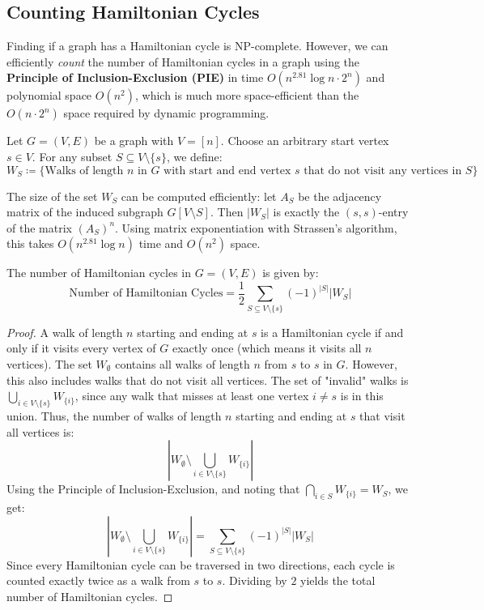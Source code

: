 \subsection{Counting Hamiltonian Cycles}

Finding if a graph has a Hamiltonian cycle is NP-complete. However, we can efficiently \textit{count} the number of Hamiltonian cycles in a graph using the \textbf{Principle of Inclusion-Exclusion (PIE)} in time $O(n^{2.81} \log n \cdot 2^n)$ and polynomial space $O(n^2)$, which is much more space-efficient than the $O(n \cdot 2^n)$ space required by dynamic programming.

\begin{definition}
    Let $G = (V, E)$ be a graph with $V = [n]$. Choose an arbitrary start vertex $s \in V$. For any subset $S \subseteq V \setminus \{s\}$, we define:
    $$W_S \coloneqq \{ \text{Walks of length } n \text{ in } G \text{ with start and end vertex } s \text{ that do not visit any vertices in } S \}$$
\end{definition}

\begin{remark}
    The size of the set $W_S$ can be computed efficiently: let $A_S$ be the adjacency matrix of the induced subgraph $G[V \setminus S]$. Then $|W_S|$ is exactly the $(s,s)$-entry of the matrix $(A_S)^n$.
    Using matrix exponentiation with Strassen's algorithm, this takes $O(n^{2.81} \log n)$ time and $O(n^2)$ space.
\end{remark}

\begin{theorem}
    The number of Hamiltonian cycles in $G = (V, E)$ is given by:
    $$\text{Number of Hamiltonian Cycles} = \frac{1}{2} \sum_{S \subseteq V \setminus \{s\}} (-1)^{|S|} |W_S|$$
\end{theorem}

\begin{proof}
    A walk of length $n$ starting and ending at $s$ is a Hamiltonian cycle if and only if it visits every vertex of $G$ exactly once (which means it visits all $n$ vertices). 
    The set $W_{\emptyset}$ contains all walks of length $n$ from $s$ to $s$ in $G$. However, this also includes walks that do not visit all vertices. The set of "invalid" walks is $\bigcup_{i \in V \setminus \{s\}} W_{\{i\}}$, since any walk that misses at least one vertex $i \neq s$ is in this union.
    Thus, the number of walks of length $n$ starting and ending at $s$ that visit all vertices is:
    $$\left| W_{\emptyset} \setminus \bigcup_{i \in V \setminus \{s\}} W_{\{i\}} \right|$$
    Using the Principle of Inclusion-Exclusion, and noting that $\bigcap_{i \in S} W_{\{i\}} = W_S$, we get:
    $$\left| W_{\emptyset} \setminus \bigcup_{i \in V \setminus \{s\}} W_{\{i\}} \right| = \sum_{S \subseteq V \setminus \{s\}} (-1)^{|S|} |W_S|$$
    Since every Hamiltonian cycle can be traversed in two directions, each cycle is counted exactly twice as a walk from $s$ to $s$. Dividing by $2$ yields the total number of Hamiltonian cycles.
\end{proof}

